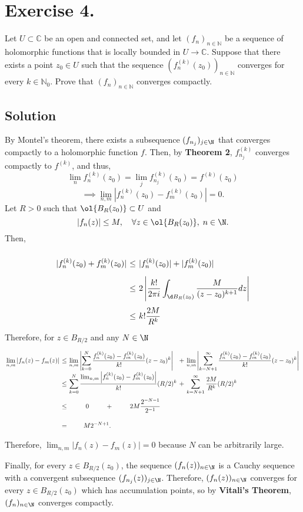 
\section*{Exercise 4.}

Let \( U \subset \mathbb{C} \) be an open and connected set, and let \( (f_n)_{n \in \mathbb{N}} \) be a sequence of holomorphic functions that is locally bounded in \( U \to \mathbb{C} \). Suppose that there exists a point \( z_0 \in U \) such that the sequence \( (f_n^{(k)}(z_0))_{n \in \mathbb{N}} \) converges for every \( k \in \mathbb{N}_0 \). Prove that \( (f_n)_{n \in \mathbb{N}} \) converges compactly.

\subsection*{Solution}

By Montel's theorem, there exists a subsequence $(f_{n_j})_{j\in\N}$ that converges compactly to a holomorphic function $f$. Then, by \textbf{Theorem 2}, $f_{n_j}^{(k)}$ converges compactly to $f^{(k)}$, and thus,
\[ \lim_n f_n^{(k)}(z_0) = \lim_j f_{n_j}^{(k)}(z_0) = f^{(k)}(z_0) \]
\[ \implies \lim_{n,m} |f_n^{(k)}(z_0) - f_m^{(k)}(z_0)| = 0. \]
Let $R > 0$ such that $\ol{B_R(z_0)} \subset U$ and
\[ |f_n(z)| \leq M,\hspace{1em} \forall z \in \ol{B_R(z_0)},\; n\in \N. \]
Then,
\[ \everymath{\displaystyle}
\arraycolsep=1.8pt\def\arraystretch{2.5}
\begin{array}{rcl}
    |f_n^{(k)}(z_0) + f_m^{(k)}(z_0)| & \leq & |f_n^{(k)}(z_0)| + |f_m^{(k)}(z_0)|\\
    & \leq & 2  \left| \frac{k!}{2\pi i} \int_{\d B_R(z_0)}\frac{M}{(z-z_0)^{k+1}} dz \right|\\
    & \leq & k! \frac{2M}{R^k}
\end{array} \]
Therefore, for $z \in B_{R/2}$ and any $N \in \N$
\[ \everymath{\displaystyle}
\arraycolsep=1.8pt\def\arraystretch{2.5}
\begin{array}{rclcl}
    \lim_{n,m}|f_n(z) - f_m(z)| & \leq & \lim_{n,m}\left| \sum_{k = 0}^{N} \frac{f_n^{(k)}(z_0)-f_m^{(k)}(z_0)}{k!} (z-z_0)^k \right| & + & \lim_{n,m}\left| \sum_{k = N+1}^{\infty} \frac{f_n^{(k)}(z_0)-f_m^{(k)}(z_0)}{k!} (z-z_0)^k \right|\\
    & \leq & \sum_{k = 0}^{N} \frac{\lim_{n,m}\left| f_n^{(k)}(z_0)-f_m^{(k)}(z_0) \right|}{k!} (R/2)^k & + & \sum_{k = N+1}^{\infty} \frac{2M}{R^k}(R/2)^k\\
    & \leq & \hfill 0 \hfill+ \hfill 2M \frac{2^{-N-1}}{2^{-1}}\hfill\\
    & = & \hspace{2.2em} M 2^{-N+1}.
\end{array} \]
Therefore, $\lim_{n,m}|f_n(z) - f_m(z)| = 0$ because $N$ can be arbitrarily large.

Finally, for every $z \in B_{R/2}(z_0)$, the sequence $(f_n(z))_{n\in\N}$ is a Cauchy sequence with a convergent subsequence $(f_{n_j}(z))_{j\in\N}$. Therefore, $(f_n(z))_{n\in\N}$ converges for every $z \in B_{R/2}(z_0)$ which has accumulation points, so by \textbf{Vitali's Theorem}, $(f_n)_{n\in\N}$ converges compactly.
